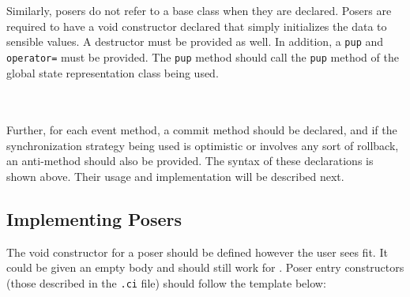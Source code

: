 Similarly, posers do not refer to a base class when they are
declared.  Posers are required to have a void constructor declared
that simply initializes the data to sensible values.  A destructor
must be provided as well.  In addition, a {\tt pup} and {\tt
operator=} must be provided.  The {\tt pup} method should call the
{\tt pup} method of the global state representation class being used.

~\\
\\

Further, for each event method, a commit method should be declared,
and if the synchronization strategy being used is optimistic or
involves any sort of rollback, an anti-method should also be provided.
The syntax of these declarations is shown above.  Their usage and
implementation will be described next.

\subsection{Implementing Posers}

The void constructor for a poser should be defined however the user
sees fit.  It could be given an empty body and should still work for
\pose{}.  Poser entry constructors (those described in the {\tt .ci}
file) should follow the template below:

~\\
\\

